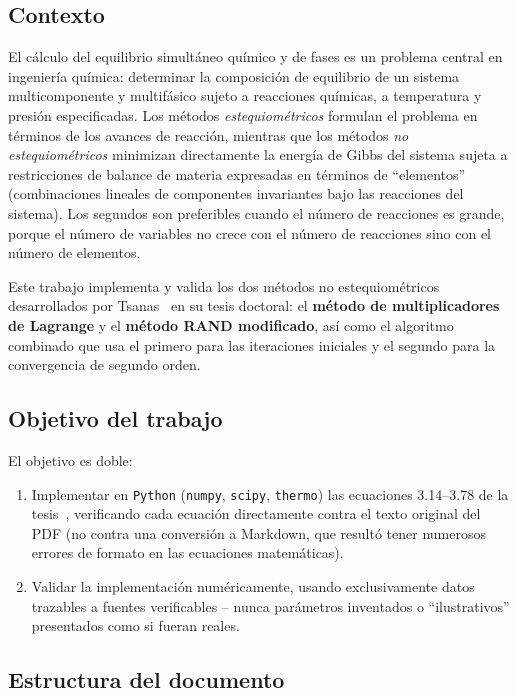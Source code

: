 \documentclass[11pt,a4paper]{article}
\begin{document}
\subsection{Contexto}

El cálculo del equilibrio simultáneo químico y de fases es un problema
central en ingeniería química: determinar la composición de equilibrio
de un sistema multicomponente y multifásico sujeto a reacciones
químicas, a temperatura y presión especificadas. Los métodos
\emph{estequiométricos} formulan el problema en términos de los
avances de reacción, mientras que los métodos \emph{no
estequiométricos} minimizan directamente la energía de Gibbs del
sistema sujeta a restricciones de balance de materia expresadas en
términos de ``elementos'' (combinaciones lineales de componentes
invariantes bajo las reacciones del sistema). Los segundos son
preferibles cuando el número de reacciones es grande, porque el número
de variables no crece con el número de reacciones sino con el número
de elementos.

Este trabajo implementa y valida los dos métodos no estequiométricos
desarrollados por Tsanas~\citep{tsanas2018} en su tesis doctoral: el
\textbf{método de multiplicadores de Lagrange} y el \textbf{método
RAND modificado}, así como el algoritmo combinado que usa el primero
para las iteraciones iniciales y el segundo para la convergencia de
segundo orden.

\subsection{Objetivo del trabajo}

El objetivo es doble:
\begin{enumerate}
  \item Implementar en \texttt{Python} (\texttt{numpy}, \texttt{scipy},
    \texttt{thermo}) las ecuaciones 3.14--3.78 de la
    tesis~\citep{tsanas2018}, verificando cada ecuación directamente
    contra el texto original del PDF (no contra una conversión a
    Markdown, que resultó tener numerosos errores de formato en las
    ecuaciones matemáticas).
  \item Validar la implementación numéricamente, usando exclusivamente
    datos trazables a fuentes verificables -- nunca parámetros
    inventados o ``ilustrativos'' presentados como si fueran reales.
\end{enumerate}

\subsection{Estructura del documento}
\end{document}
